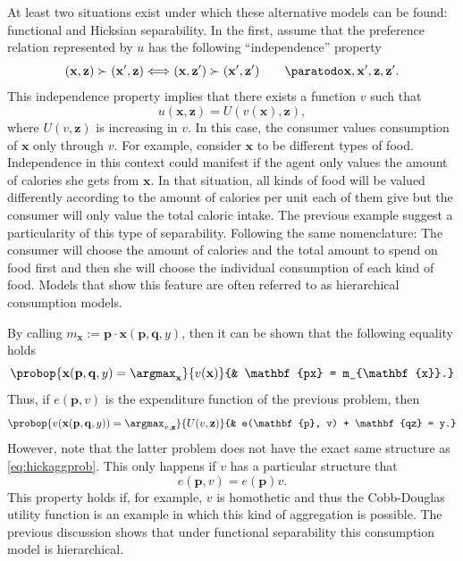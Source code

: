 \documentclass[english, a4paper,12pt]{article}
\begin{document}
At least two situations exist under which these alternative models can be found: functional and Hicksian separability. In the first, assume that the preference relation represented by $u$ has the following ``independence'' property
	\begin{equation} \label{eq:indepPref}
		(\mathbf{x}, \mathbf{z}) \succ (\mathbf{x}', \mathbf{z}) 
			\Longleftrightarrow
		(\mathbf{x}, \mathbf{z}') \succ (\mathbf{x}', \mathbf{z}') \qquad \paratodo \mathbf{x}, \mathbf{x}', \mathbf{z}, \mathbf{z}'.
	\end{equation}
This independence property implies that there exists a function $v$ such that
	$$u(\mathbf{x}, \mathbf{z}) = U(v(\mathbf{x}), \mathbf{z}),$$
where $U(v,\mathbf{z})$ is increasing in $v$. In this case, the consumer values consumption of $\mathbf{x}$ only through $v$. For example, consider $\mathbf{x}$ to be different types of food. Independence in this context could manifest if the agent only values the amount of calories she gets from $\mathbf{x}$. In that situation, all kinds of food will be valued differently according to the amount of calories per unit each of them give but the consumer will only value the total caloric intake. The previous example suggest a particularity of this type of separability. Following the same nomenclature: The consumer will choose the amount of calories and the total amount to spend on food first and then she will choose the individual consumption of each kind of food. Models that show this feature are often referred to as hierarchical consumption models.

By calling $m_{\mathbf{x}} := \mathbf{p}\cdot \mathbf{x}(\mathbf{p}, \mathbf{q}, y)$, then it can be shown that the following equality holds
	$$\probop{\mathbf{x}(\mathbf{p}, \mathbf{q}, y) = \argmax_{\mathbf{x}}}{v(\mathbf{x})}
					{&	\mathbf{px} = m_{\mathbf{x}}.}$$
Thus, if $e(\mathbf{p}, v)$ is the expenditure function of the previous problem, then
	$$	\probop{v(\mathbf{x}(\mathbf{p}, \mathbf{q}, y)) = \argmax_{v, \mathbf{z}}}{U(v, \mathbf{z})}
				{&	e(\mathbf{p}, v) + \mathbf{qz} = y.}
	$$
However, note that the latter problem does not have the exact same structure as \eqref{eq:hickaggprob}. This only happens if $v$ has a particular structure that 
	$$e(\mathbf{p}, v) = e(\mathbf{p})v.$$
This property holds if, for example, $v$ is homothetic and thus the Cobb-Douglas utility function is an example in which this kind of aggregation is possible. The previous discussion shows that under functional separability this consumption model is hierarchical.
\end{document}
